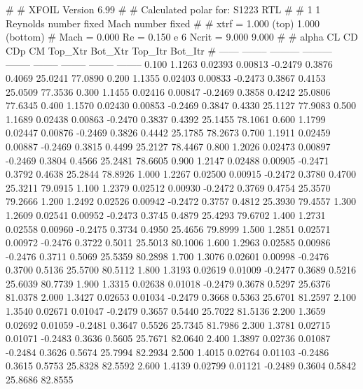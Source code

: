 #  
#       XFOIL         Version 6.99
#  
# Calculated polar for: S1223 RTL                                       
#  
# 1 1 Reynolds number fixed          Mach number fixed         
#  
# xtrf =   1.000 (top)        1.000 (bottom)  
# Mach =   0.000     Re =     0.150 e 6     Ncrit =   9.000  9.000
#  
#   alpha    CL        CD       CDp       CM     Top_Xtr  Bot_Xtr  Top_Itr  Bot_Itr
#  ------ -------- --------- --------- -------- -------- -------- -------- --------
   0.100   1.1263   0.02393   0.00813  -0.2479   0.3876   0.4069  25.0241  77.0890
   0.200   1.1355   0.02403   0.00833  -0.2473   0.3867   0.4153  25.0509  77.3536
   0.300   1.1455   0.02416   0.00847  -0.2469   0.3858   0.4242  25.0806  77.6345
   0.400   1.1570   0.02430   0.00853  -0.2469   0.3847   0.4330  25.1127  77.9083
   0.500   1.1689   0.02438   0.00863  -0.2470   0.3837   0.4392  25.1455  78.1061
   0.600   1.1799   0.02447   0.00876  -0.2469   0.3826   0.4442  25.1785  78.2673
   0.700   1.1911   0.02459   0.00887  -0.2469   0.3815   0.4499  25.2127  78.4467
   0.800   1.2026   0.02473   0.00897  -0.2469   0.3804   0.4566  25.2481  78.6605
   0.900   1.2147   0.02488   0.00905  -0.2471   0.3792   0.4638  25.2844  78.8926
   1.000   1.2267   0.02500   0.00915  -0.2472   0.3780   0.4700  25.3211  79.0915
   1.100   1.2379   0.02512   0.00930  -0.2472   0.3769   0.4754  25.3570  79.2666
   1.200   1.2492   0.02526   0.00942  -0.2472   0.3757   0.4812  25.3930  79.4557
   1.300   1.2609   0.02541   0.00952  -0.2473   0.3745   0.4879  25.4293  79.6702
   1.400   1.2731   0.02558   0.00960  -0.2475   0.3734   0.4950  25.4656  79.8999
   1.500   1.2851   0.02571   0.00972  -0.2476   0.3722   0.5011  25.5013  80.1006
   1.600   1.2963   0.02585   0.00986  -0.2476   0.3711   0.5069  25.5359  80.2898
   1.700   1.3076   0.02601   0.00998  -0.2476   0.3700   0.5136  25.5700  80.5112
   1.800   1.3193   0.02619   0.01009  -0.2477   0.3689   0.5216  25.6039  80.7739
   1.900   1.3315   0.02638   0.01018  -0.2479   0.3678   0.5297  25.6376  81.0378
   2.000   1.3427   0.02653   0.01034  -0.2479   0.3668   0.5363  25.6701  81.2597
   2.100   1.3540   0.02671   0.01047  -0.2479   0.3657   0.5440  25.7022  81.5136
   2.200   1.3659   0.02692   0.01059  -0.2481   0.3647   0.5526  25.7345  81.7986
   2.300   1.3781   0.02715   0.01071  -0.2483   0.3636   0.5605  25.7671  82.0640
   2.400   1.3897   0.02736   0.01087  -0.2484   0.3626   0.5674  25.7994  82.2934
   2.500   1.4015   0.02764   0.01103  -0.2486   0.3615   0.5753  25.8328  82.5592
   2.600   1.4139   0.02799   0.01121  -0.2489   0.3604   0.5842  25.8686  82.8555
